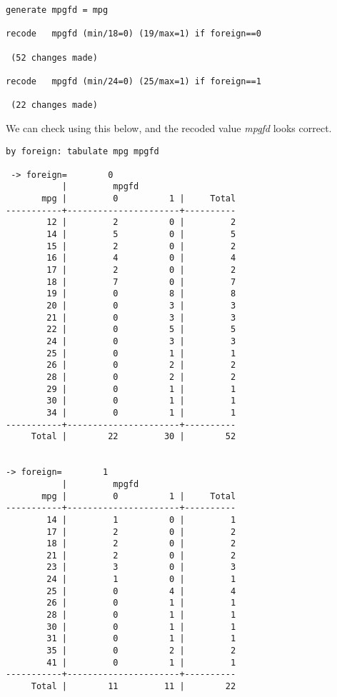 \begin{lstlisting}
generate mpgfd = mpg

recode   mpgfd (min/18=0) (19/max=1) if foreign==0

 (52 changes made)

recode   mpgfd (min/24=0) (25/max=1) if foreign==1

 (22 changes made)
\end{lstlisting}

We can check using this below, and the recoded value \textit{mpgfd} looks correct.

\begin{lstlisting}
by foreign: tabulate mpg mpgfd

 -> foreign=        0
           |         mpgfd
       mpg |         0          1 |     Total
-----------+----------------------+----------
        12 |         2          0 |         2
        14 |         5          0 |         5
        15 |         2          0 |         2
        16 |         4          0 |         4
        17 |         2          0 |         2
        18 |         7          0 |         7
        19 |         0          8 |         8
        20 |         0          3 |         3
        21 |         0          3 |         3
        22 |         0          5 |         5
        24 |         0          3 |         3
        25 |         0          1 |         1
        26 |         0          2 |         2
        28 |         0          2 |         2
        29 |         0          1 |         1
        30 |         0          1 |         1
        34 |         0          1 |         1
-----------+----------------------+----------
     Total |        22         30 |        52


-> foreign=        1
           |         mpgfd
       mpg |         0          1 |     Total
-----------+----------------------+----------
        14 |         1          0 |         1
        17 |         2          0 |         2
        18 |         2          0 |         2
        21 |         2          0 |         2
        23 |         3          0 |         3
        24 |         1          0 |         1
        25 |         0          4 |         4
        26 |         0          1 |         1
        28 |         0          1 |         1
        30 |         0          1 |         1
        31 |         0          1 |         1
        35 |         0          2 |         2
        41 |         0          1 |         1
-----------+----------------------+----------
     Total |        11         11 |        22
\end{lstlisting}

